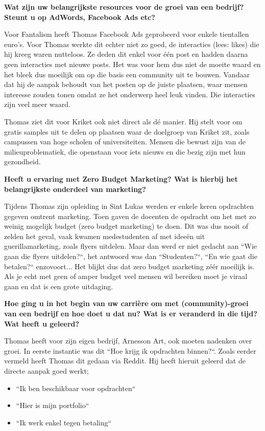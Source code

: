 \textbf{Wat zijn uw belangrijkste resources voor de groei van een bedrijf? Steunt u op AdWords, Facebook Ads etc?}
	
Voor Fantalism heeft Thomas Facebook Ads geprobeerd voor enkele tientallen euro's. Voor Thomas werkte dit echter niet zo goed, de interacties (lees: likes) die hij kreeg waren nutteloos. Ze deden dit enkel voor één post en hadden daarna geen interacties met nieuwe posts. Het was voor hem dus niet de moeite waard en het bleek dus moeilijk om op die basis een community uit te bouwen. Vandaar dat hij de aanpak behoudt van het posten op de juiste plaatsen, waar mensen interesse zouden tonen omdat ze het onderwerp heel leuk vinden. Die interacties zijn veel meer waard.

Thomas ziet dit voor Kriket ook niet direct als dé manier. Hij stelt voor om gratis samples uit te delen op plaatsen waar de doelgroep van Kriket zit, zoals campussen van hoge scholen of universiteiten. Mensen die bewust zijn van de milieuproblematiek, die openstaan voor iets nieuws en die bezig zijn met hun gezondheid.
	
\textbf{Heeft u ervaring met Zero Budget Marketing? Wat is hierbij het belangrijkste onderdeel van marketing?}
	
Tijdens Thomas zijn opleiding in Sint Lukas werden er enkele keren opdrachten gegeven omtrent marketing. Toen gaven de docenten de opdracht om het met zo weinig mogelijk budget (zero budget marketing) te doen. Dit was dus nooit of zelden het geval, vaak kwamen medestudenten af met ideeën uit guerillamarketing, zoals flyers uitdelen. Maar dan werd er niet gedacht aan ``Wie gaan die flyers uitdelen?``, het antwoord was dan ``Studenten?``, ``En wie gaat die betalen?`` enzovoort... Het blijkt dus dat zero budget marketing zéér moeilijk is. Als je echt met geen of amper budget veel mensen wil bereiken moet je viraal gaan en dat is een grote uitdaging.
	
\textbf{Hoe ging u in het begin van uw carrière om met (community)-groei van een bedrijf en hoe doet u dat nu? Wat is er veranderd in die tijd? Wat heeft u geleerd?}
	
Thomas heeft voor zijn eigen bedrijf, Arnesson Art, ook moeten nadenken over groei. In eerste instantie was dit ``Hoe krijg ik opdrachten binnen?``. Zoals eerder vermeld heeft Thomas dit gedaan via Reddit. Hij heeft hieruit geleerd dat de directe aanpak goed werkt;

\begin{itemize} 
	\item ``Ik ben beschikbaar voor opdrachten``
	\item ``Hier is mijn portfolio``
	\item ``Ik werk enkel tegen betaling``
\end{itemize} 

